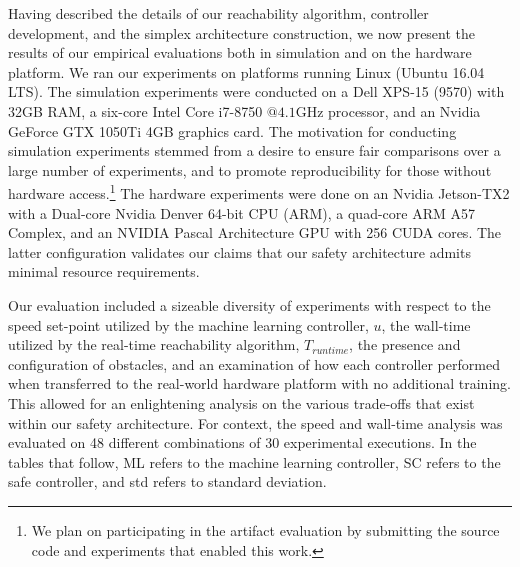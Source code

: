\documentclass[manuscript,screen,review]{acmart}
\begin{document}



Having described the details of our reachability algorithm, controller development, and the simplex architecture construction, we now present the results of our empirical evaluations both in simulation and on the hardware platform. We ran our experiments on platforms running Linux (Ubuntu 16.04 LTS). The simulation experiments were conducted on a Dell XPS-15 (9570) with 32GB RAM, a six-core Intel Core i7-8750 $@ 4.1\textrm{GHz}$ processor, and an Nvidia GeForce GTX 1050Ti 4GB graphics card. The motivation for conducting simulation experiments stemmed from a desire to ensure fair comparisons over a large number of experiments, and to promote reproducibility for those without hardware access.\footnote{We plan on participating in the artifact evaluation by submitting the source code and experiments that enabled this work.} The hardware experiments were done on an Nvidia Jetson-TX2 with a Dual-core Nvidia Denver 64-bit CPU (ARM), a quad-core ARM A57 Complex, and an NVIDIA Pascal Architecture GPU with 256 CUDA cores. The latter configuration validates our claims that our safety architecture admits minimal resource requirements. 


Our evaluation included a sizeable diversity of experiments with respect to the speed set-point utilized by the machine learning controller, $u$, the wall-time utilized by the real-time reachability algorithm, $T_{runtime}$, the presence and configuration of obstacles, and an examination of how each controller performed when transferred to the real-world hardware platform with no additional training. This allowed for an enlightening analysis on the various trade-offs that exist within our safety architecture. For context, the speed and wall-time analysis was evaluated on 48 different combinations of 30 experimental executions. %
In the tables that follow, ML refers to the machine learning controller, SC refers to the safe controller, and std refers to standard deviation. %
\end{document}
